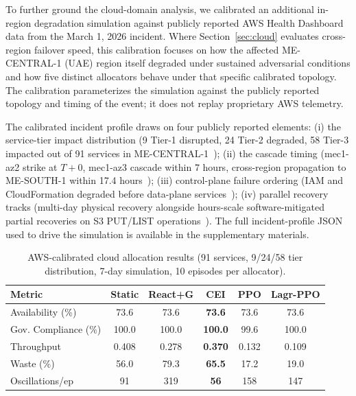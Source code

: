 \documentclass[runningheads]{llncs}
\begin{document}
To further ground the cloud-domain analysis, we calibrated an additional in-region degradation simulation against publicly reported AWS Health Dashboard data from the March 1, 2026 incident. Where Section~\ref{sec:cloud} evaluates cross-region failover speed, this calibration focuses on how the affected ME-CENTRAL-1 (UAE) region itself degraded under sustained adversarial conditions and how five distinct allocators behave under that specific calibrated topology. The calibration parameterizes the simulation against the publicly reported topology and timing of the event; it does not replay proprietary AWS telemetry.

The calibrated incident profile draws on four publicly reported elements: (i) the service-tier impact distribution (9 Tier-1 disrupted, 24 Tier-2 degraded, 58 Tier-3 impacted out of 91 services in ME-CENTRAL-1~\cite{cybersec_news}); (ii) the cascade timing (mec1-az2 strike at $T+0$, mec1-az3 cascade within 7 hours, cross-region propagation to ME-SOUTH-1 within 17.4 hours~\cite{defensescoop,infoq}); (iii) control-plane failure ordering (IAM and CloudFormation degraded before data-plane services~\cite{cybersec_news}); (iv) parallel recovery tracks (multi-day physical recovery alongside hours-scale software-mitigated partial recoveries on S3 PUT/LIST operations~\cite{aws_pes}). The full incident-profile JSON used to drive the simulation is available in the supplementary materials.

\begin{table}[ht]
\caption{AWS-calibrated cloud allocation results (91 services, 9/24/58 tier distribution, 7-day simulation, 10 episodes per allocator).}
\label{tab:aws_cal}
\centering
\small
\begin{tabular}{lccccc}
\toprule
Metric & Static & React+G & \textbf{CEI} & PPO & Lagr-PPO \\
\midrule
Availability (\%)     & 73.6  & 73.6  & \textbf{73.6}  & 73.6  & 73.6  \\
Gov. Compliance (\%)  & 100.0 & 100.0 & \textbf{100.0} & 99.6  & 100.0 \\
Throughput            & 0.408 & 0.278 & \textbf{0.370} & 0.132 & 0.109 \\
Waste (\%)            & 56.0  & 79.3  & \textbf{65.5}  & 17.2  & 19.0  \\
Oscillations/ep       & 91    & 319   & \textbf{56}    & 158   & 147   \\
\bottomrule
\end{tabular}
\end{table}
\end{document}
